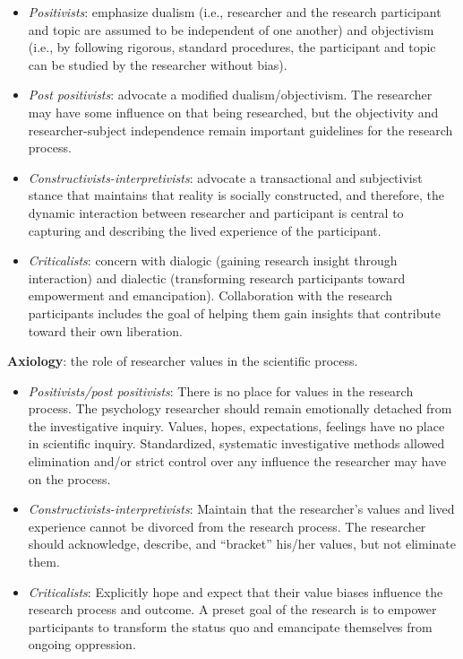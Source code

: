 \documentclass[
  english,
]{book}
\providecommand{\tightlist}{%
  \setlength{\itemsep}{0pt}\setlength{\parskip}{0pt}}
\begin{document}
\begin{itemize}
\tightlist
\item
  \emph{Positivists}: emphasize dualism (i.e., researcher and the research participant and topic are assumed to be independent of one another) and objectivism (i.e., by following rigorous, standard procedures, the participant and topic can be studied by the researcher without bias).
\item
  \emph{Post positivists}: advocate a modified dualism/objectivism. The researcher may have some influence on that being researched, but the objectivity and researcher-subject independence remain important guidelines for the research process.
\item
  \emph{Constructivists-interpretivists}: advocate a transactional and subjectivist stance that maintains that reality is socially constructed, and therefore, the dynamic interaction between researcher and participant is central to capturing and describing the lived experience of the participant.
\item
  \emph{Criticalists}: concern with dialogic (gaining research insight through interaction) and dialectic (transforming research participants toward empowerment and emancipation). Collaboration with the research participants includes the goal of helping them gain insights that contribute toward their own liberation.
\end{itemize}

\textbf{Axiology}: the role of researcher values in the scientific process.

\begin{itemize}
\tightlist
\item
  \emph{Positivists/post positivists}: There is no place for values in the research process. The psychology researcher should remain emotionally detached from the investigative inquiry. Values, hopes, expectations, feelings have no place in scientific inquiry. Standardized, systematic investigative methods allowed elimination and/or strict control over any influence the researcher may have on the process.
\item
  \emph{Constructivists-interpretivists}: Maintain that the researcher's values and lived experience cannot be divorced from the research process. The researcher should acknowledge, describe, and ``bracket'' his/her values, but not eliminate them.
\item
  \emph{Criticalists}: Explicitly hope and expect that their value biases influence the research process and outcome. A preset goal of the research is to empower participants to transform the status quo and emancipate themselves from ongoing oppression.
\end{itemize}
\end{document}
